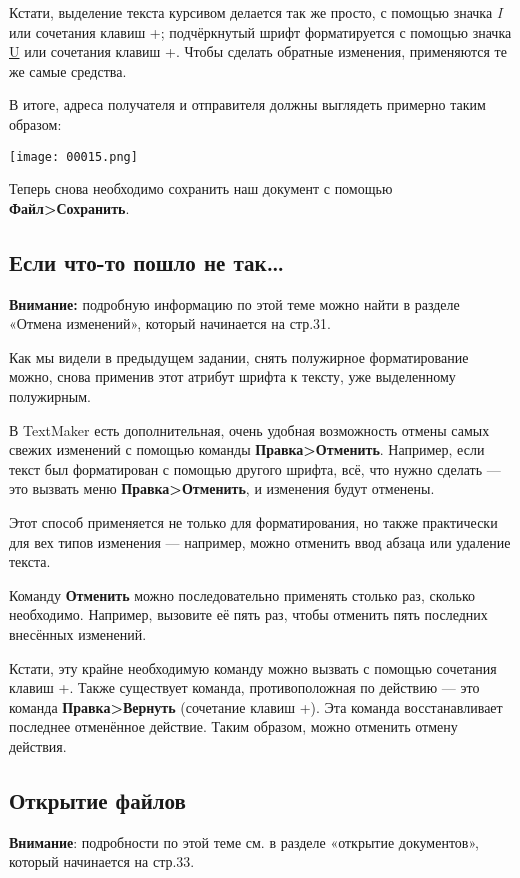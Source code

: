\documentclass[a4paper,10pt]{article}
\begin{document}
Кстати, выделение текста курсивом делается так же просто, с помощью значка \textit{I} или сочетания клавиш +; подчёркнутый шрифт форматируется с помощью значка \underline{U} или сочетания клавиш +. Чтобы сделать обратные  изменения, применяются те же самые средства.

В итоге, адреса получателя и отправителя должны выглядеть примерно таким образом:

\texttt{[image: 00015.png]}

Теперь снова необходимо сохранить наш документ с помощью \textbf{Файл>Сохранить}.

\subsection{Если что-то пошло не так…}
\textbf{Внимание:} подробную информацию по этой теме можно найти в разделе «Отмена изменений», который начинается на стр.31.

Как мы видели в предыдущем задании, снять полужирное форматирование можно, снова применив этот атрибут шрифта к тексту, уже выделенному полужирным.

В TextMaker есть дополнительная, очень удобная возможность отмены самых свежих изменений с помощью команды \textbf{Правка>Отменить}. Например, если текст был форматирован с помощью другого шрифта, всё, что нужно сделать --- это вызвать меню \textbf{Правка>Отменить}, и изменения будут отменены.

Этот способ применяется не только для форматирования, но также практически для вех типов изменения — например, можно отменить ввод абзаца или удаление текста.

Команду \textbf{Отменить} можно последовательно применять столько раз, сколько необходимо. Например, вызовите её пять раз, чтобы отменить пять последних внесённых изменений.

Кстати, эту крайне необходимую команду можно вызвать с помощью сочетания клавиш +.
Также существует команда, противоположная по действию --- это команда \textbf{Правка>Вернуть} (сочетание клавиш +). Эта команда восстанавливает последнее отменённое действие. Таким образом, можно отменить отмену действия.

\subsection{Открытие файлов}
\textbf{Внимание}: подробности по этой теме см. в разделе «открытие документов», который начинается на стр.33.
\end{document}
